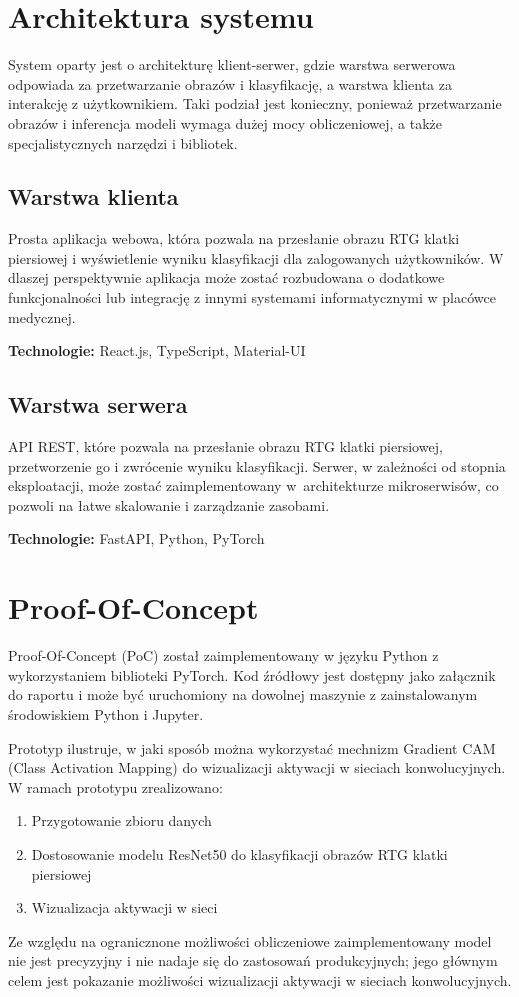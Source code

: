\documentclass{article}
\begin{document}
\section{Architektura systemu}
System oparty jest o architekturę klient-serwer, gdzie warstwa serwerowa odpowiada za przetwarzanie obrazów i klasyfikację, a warstwa klienta za interakcję z użytkownikiem.
Taki podział jest konieczny, ponieważ przetwarzanie obrazów i inferencja modeli wymaga dużej mocy obliczeniowej, a także specjalistycznych narzędzi i bibliotek.

\subsection{Warstwa klienta}
Prosta aplikacja webowa, która pozwala na przesłanie obrazu RTG klatki piersiowej i wyświetlenie wyniku klasyfikacji dla zalogowanych użytkowników.
W dlaszej perspektywnie aplikacja może zostać rozbudowana o dodatkowe funkcjonalności lub integrację z innymi systemami informatycznymi w placówce medycznej.

\textbf{Technologie:} React.js, TypeScript, Material-UI


\subsection{Warstwa serwera}
API REST, które pozwala na przesłanie obrazu RTG klatki piersiowej, przetworzenie go i zwrócenie wyniku klasyfikacji.
Serwer, w zależności od stopnia eksploatacji, może zostać zaimplementowany w~architekturze mikroserwisów, co pozwoli na łatwe skalowanie i zarządzanie zasobami.

\textbf{Technologie:} FastAPI, Python, PyTorch

\section{Proof-Of-Concept}
Proof-Of-Concept (PoC) został zaimplementowany w języku Python z wykorzystaniem biblioteki PyTorch. Kod źródłowy jest dostępny jako załącznik do raportu i może być uruchomiony na dowolnej maszynie z zainstalowanym środowiskiem Python i Jupyter.

Prototyp ilustruje, w jaki sposób można wykorzystać mechnizm Gradient CAM (Class Activation Mapping) \cite{selvaraju2017gradcam} do wizualizacji aktywacji w sieciach konwolucyjnych.
W ramach prototypu zrealizowano:
\begin{enumerate}
  \item Przygotowanie zbioru danych
  \item Dostosowanie modelu ResNet50 do klasyfikacji obrazów RTG klatki piersiowej
  \item Wizualizacja aktywacji w sieci
\end{enumerate}
Ze względu na ogranicznone możliwości obliczeniowe zaimplementowany model nie jest precyzyjny i nie nadaje się do zastosowań produkcyjnych;
jego głównym celem jest pokazanie możliwości wizualizacji aktywacji w sieciach konwolucyjnych.
\end{document}
